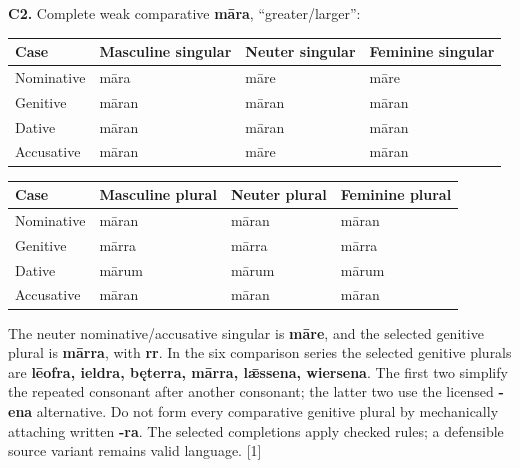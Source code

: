 \par\begin{minipage}{\linewidth}\raggedright
\textbf{C2.} Complete weak comparative \textbf{māra}, “greater/\allowbreak{}larger”:

\par\begingroup
\fontsize{10.5}{13.2}\selectfont
\setlength{\LTleft}{0pt}\setlength{\LTright}{\fill}
\noindent
\begin{tabular}{@{}>{\raggedright\arraybackslash}p{22.0mm}>{\raggedright\arraybackslash}p{31.188mm}>{\raggedright\arraybackslash}p{31.188mm}>{\raggedright\arraybackslash}p{31.188mm}@{}}
\toprule
\textbf{Case} & \textbf{Masculine singular} & \textbf{Neuter singular} & \textbf{Feminine singular} \\
\midrule
Nominative & māra & māre & māre \\
Genitive & māran & māran & māran \\
Dative & māran & māran & māran \\
Accusative & māran & māre & māran \\
\bottomrule
\end{tabular}
\par\endgroup
\par\addvspace{5pt}
\par\begingroup
\fontsize{10.5}{13.2}\selectfont
\setlength{\LTleft}{0pt}\setlength{\LTright}{\fill}
\noindent
\begin{tabular}{@{}>{\raggedright\arraybackslash}p{22.0mm}>{\raggedright\arraybackslash}p{31.188mm}>{\raggedright\arraybackslash}p{31.188mm}>{\raggedright\arraybackslash}p{31.188mm}@{}}
\toprule
\textbf{Case} & \textbf{Masculine plural} & \textbf{Neuter plural} & \textbf{Feminine plural} \\
\midrule
Nominative & māran & māran & māran \\
Genitive & mārra & mārra & mārra \\
Dative & mārum & mārum & mārum \\
Accusative & māran & māran & māran \\
\bottomrule
\end{tabular}
\par\endgroup
The neuter nominative/\allowbreak{}accusative singular is \textbf{māre}, and the selected genitive plural is \textbf{mārra}, with \textbf{rr}. In the six comparison series the selected genitive plurals are \textbf{lēofra, ieldra, bęterra, mārra, lǣssena, wiersena}. The first two simplify the repeated consonant after another consonant; the latter two use the licensed \textbf{-ena} alternative. Do not form every comparative genitive plural by mechanically attaching written \textbf{-ra}. The selected completions apply checked rules; a defensible source variant remains valid language. [1]

\end{minipage}\par\addvspace{4pt}

